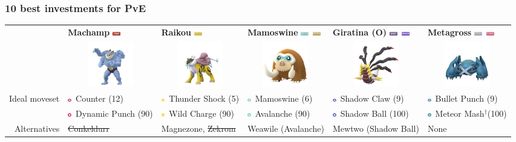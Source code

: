 \documentclass[8pt,aspectratio=169,compress]{beamer}
\newcommand{\fightingfull}{\includegraphics[height=0.15cm]{../../images/type/full/Fighting.png}}
\newcommand{\electricfull}{\includegraphics[height=0.15cm]{../../images/type/full/Electric.png}}
\newcommand{\ghostfull}{\includegraphics[height=0.15cm]{../../images/type/full/Ghost.png}}
\newcommand{\dragonfull}{\includegraphics[height=0.15cm]{../../images/type/full/Dragon.png}}
\newcommand{\groundfull}{\includegraphics[height=0.15cm]{../../images/type/full/Ground.png}}
\newcommand{\icefull}{\includegraphics[height=0.15cm]{../../images/type/full/Ice.png}}
\newcommand{\psychicfull}{\includegraphics[height=0.15cm]{../../images/type/full/Psychic.png}}
\newcommand{\steelfull}{\includegraphics[height=0.15cm]{../../images/type/full/Steel.png}}
\newcommand{\fightingsimp}{\includegraphics[height=0.15cm]{../../images/type/simplified/fighting.png}}
\newcommand{\ghostsimp}{\includegraphics[height=0.15cm]{../../images/type/simplified/ghost.png}}
\newcommand{\icesimp}{\includegraphics[height=0.15cm]{../../images/type/simplified/ice.png}}
\newcommand{\electricsimp}{\includegraphics[height=0.15cm]{../../images/type/simplified/electric.png}}
\newcommand{\steelsimp}{\includegraphics[height=0.15cm]{../../images/type/simplified/steel.png}}
\begin{document}
\begin{frame}
\begin{tiny}
\frametitle{10 best investments for PvE}

\begin{block}{}
\begin{center}
\begin{tabular}{rp{2cm}p{2cm}p{2cm}p{2cm}p{2cm}} 
    & \textbf{Machamp} \hfill \fightingfull&  \textbf{Raikou} \hfill \electricfull&  \textbf{Mamoswine} \hfill  \icefull~\groundfull&  \textbf{Giratina (O)} \hfill \ghostfull~\dragonfull & \textbf{Metagross} \hfill \steelfull~\psychicfull  \\ 
    &  \multicolumn{1}{c}{\includegraphics[width=2cm]{../../images/pokemon/Machamp}} &   \multicolumn{1}{c}{\includegraphics[width=2cm]{../../images/pokemon/Raikou} }  &   \multicolumn{1}{c}{\includegraphics[width=2cm]{../../images/pokemon/Mamoswine} }   &   \multicolumn{1}{c}{\includegraphics[width=2cm]{../../images/pokemon/Giratina_o} }   &   \multicolumn{1}{c}{\includegraphics[width=2cm]{../../images/pokemon/Metagross} } \\ \hline
\multirow{2}{*}{Ideal moveset}   & \fightingsimp~Counter (12) & \electricsimp~Thunder Shock (5)  & \icesimp~Mamoswine (6) &\ghostsimp~Shadow Claw (9)&\steelsimp~Bullet Punch (9) \\
    &\fightingsimp~Dynamic Punch (90) &\electricsimp~Wild Charge (90) & \icesimp~Avalanche (90) &\ghostsimp~Shadow Ball (100) & \steelsimp~Meteor Mash$^{\dag}$(100) \\  \hline
Alternatives & \sout{Conkeldurr} & Magnezone, \sout{Zekrom} & Weawile (Avalanche) & Mewtwo (Shadow Ball) & None \\
\end{tabular}   


\end{center}
\end{block}
\end{tiny}
\end{frame}
\end{document}
